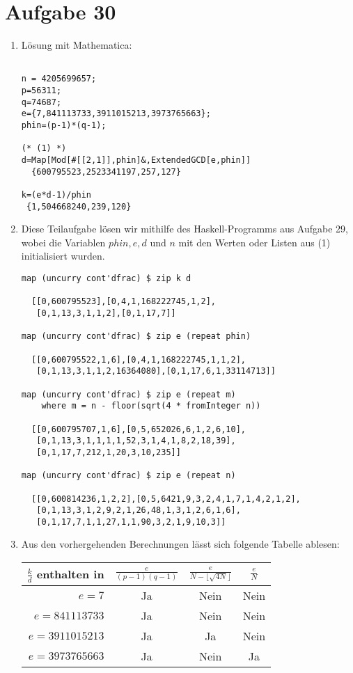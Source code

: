 \section*{Aufgabe 30}
\begin{enumerate}[(1)]
\item Lösung mit Mathematica:
\begin{lstlisting}

n = 4205699657;
p=56311;
q=74687;
e={7,841113733,3911015213,3973765663};
phin=(p-1)*(q-1);

(* (1) *)
d=Map[Mod[#[[2,1]],phin]&,ExtendedGCD[e,phin]]
  {600795523,2523341197,257,127}

k=(e*d-1)/phin
 {1,504668240,239,120}
\end{lstlisting}
\item
Diese Teilaufgabe lösen wir mithilfe des Haskell-Programms aus Aufgabe 29,
wobei die Variablen $phin, e, d$ und $n$ mit den Werten oder Listen aus (1)
initialisiert wurden.
\lstset{language=Haskell}
\begin{lstlisting}
map (uncurry cont'dfrac) $ zip k d

  [[0,600795523],[0,4,1,168222745,1,2],
   [0,1,13,3,1,1,2],[0,1,17,7]]

map (uncurry cont'dfrac) $ zip e (repeat phin)

  [[0,600795522,1,6],[0,4,1,168222745,1,1,2],
   [0,1,13,3,1,1,2,16364080],[0,1,17,6,1,33114713]]

map (uncurry cont'dfrac) $ zip e (repeat m)
	where m = n - floor(sqrt(4 * fromInteger n))

  [[0,600795707,1,6],[0,5,652026,6,1,2,6,10],
   [0,1,13,3,1,1,1,1,52,3,1,4,1,8,2,18,39],
   [0,1,17,7,212,1,20,3,10,235]]

map (uncurry cont'dfrac) $ zip e (repeat n)

  [[0,600814236,1,2,2],[0,5,6421,9,3,2,4,1,7,1,4,2,1,2],
   [0,1,13,3,1,2,9,2,1,26,48,1,3,1,2,6,1,6],
   [0,1,17,7,1,1,27,1,1,90,3,2,1,9,10,3]]

\end{lstlisting}
\item
Aus den vorhergehenden Berechnungen lässt sich folgende Tabelle ablesen:
\begin{center}
\begin{tabular}[]{r|c|c|c}
	$\frac{k}{d}$ enthalten in&$\frac{e}{(p-1)(q-1)}$&$\frac{e}{N-\lfloor\sqrt{4N}\rfloor}$&$\frac{e}{N}$\\
	\hline
	$e=7$&Ja&Nein&Nein\\
	\hline
	$e=841113733$&Ja&Nein&Nein\\
	\hline
	$e=3911015213$&Ja&Ja&Nein\\
	\hline
	$e=3973765663$&Ja&Nein&Ja
\end{tabular}
\end{center}
\end{enumerate}

